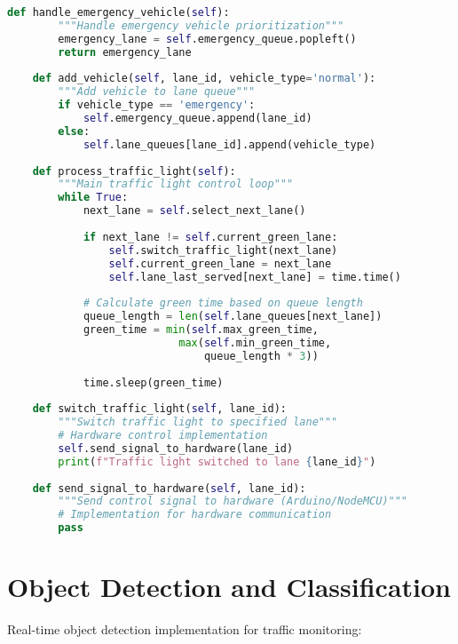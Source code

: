 \begin{lstlisting}[language=Python, caption=WJF Traffic Control Algorithm]
    def handle_emergency_vehicle(self):
        """Handle emergency vehicle prioritization"""
        emergency_lane = self.emergency_queue.popleft()
        return emergency_lane
    
    def add_vehicle(self, lane_id, vehicle_type='normal'):
        """Add vehicle to lane queue"""
        if vehicle_type == 'emergency':
            self.emergency_queue.append(lane_id)
        else:
            self.lane_queues[lane_id].append(vehicle_type)
    
    def process_traffic_light(self):
        """Main traffic light control loop"""
        while True:
            next_lane = self.select_next_lane()
            
            if next_lane != self.current_green_lane:
                self.switch_traffic_light(next_lane)
                self.current_green_lane = next_lane
                self.lane_last_served[next_lane] = time.time()
            
            # Calculate green time based on queue length
            queue_length = len(self.lane_queues[next_lane])
            green_time = min(self.max_green_time, 
                           max(self.min_green_time, 
                               queue_length * 3))
            
            time.sleep(green_time)
    
    def switch_traffic_light(self, lane_id):
        """Switch traffic light to specified lane"""
        # Hardware control implementation
        self.send_signal_to_hardware(lane_id)
        print(f"Traffic light switched to lane {lane_id}")
    
    def send_signal_to_hardware(self, lane_id):
        """Send control signal to hardware (Arduino/NodeMCU)"""
        # Implementation for hardware communication
        pass
\end{lstlisting}

\section{Object Detection and Classification}
\label{app:object_detection}

Real-time object detection implementation for traffic monitoring:

